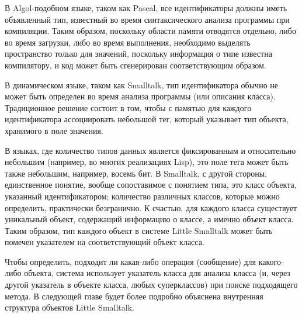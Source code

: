 
В Algol-подобном языке, таком как Pascal, все идентификаторы должны иметь
объявленный тип, известный во время синтаксического анализа программы при
компиляции. Таким образом, поскольку области памяти отводятся отдельно, либо во
время загрузки, либо во время выполнения, необходимо выделять пространство
только для значений, поскольку информация о типе известна компилятору, и код
может быть сгенерирован соответствующим образом.


В динамическом языке, таком как Smalltalk, тип идентификатора обычно не может
быть определен во время анализа программы (или описания класса). Традиционное
решение состоит в том, чтобы с памятью для каждого идентификатора ассоциировать
небольшой тег, который указывает тип объекта, хранимого в поле значения.


В языках, где количество типов данных является фиксированным и относительно
небольшим (например, во многих реализациях Lisp), это поле тега может быть также
небольшим, например, восемь бит. В Smalltalk, с другой стороны, единственное
понятие, вообще сопоставимое с понятием типа, это класс объекта, указанный
идентификатором; количество различных классов, которые можно определить,
практически безгранично. К счастью, для каждого класса существует уникальный
объект, содержащий информацию о классе, а именно объект класса. Таким образом,
тип каждого объект в системе Little Smalltalk может быть помечен указателем на
соответствующий объект класса.


Чтобы определить, подходит ли какая-либо операция (сообщение) для какого-либо
объекта, система использует указатель класса для анализа класса (и, через другой
указатель в объекте класса, любых суперклассов) при поиске подходящего метода. В
следующей главе будет более подробно объяснена внутренняя структура объектов
Little Smalltalk.
